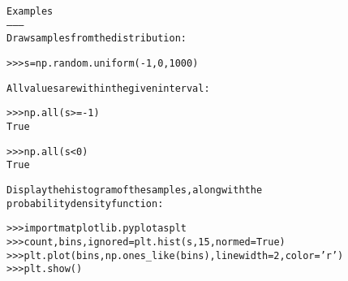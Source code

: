 \begin{boxedminipage}{\funcwidth}
\begin{alltt}
Examples
--------
Draw samples from the distribution:

{\textgreater}{\textgreater}{\textgreater} s = np.random.uniform(-1,0,1000)

All values are within the given interval:

{\textgreater}{\textgreater}{\textgreater} np.all(s {\textgreater}= -1)
True

{\textgreater}{\textgreater}{\textgreater} np.all(s {\textless} 0)
True

Display the histogram of the samples, along with the
probability density function:

{\textgreater}{\textgreater}{\textgreater} import matplotlib.pyplot as plt
{\textgreater}{\textgreater}{\textgreater} count, bins, ignored = plt.hist(s, 15, normed=True)
{\textgreater}{\textgreater}{\textgreater} plt.plot(bins, np.ones\_like(bins), linewidth=2, color='r')
{\textgreater}{\textgreater}{\textgreater} plt.show()
\end{alltt}

\setlength{\parskip}{1ex}
    \end{boxedminipage}

    \label{trunk:qstkutil:bollinger:vonmises}

    \vspace{0.5ex}

